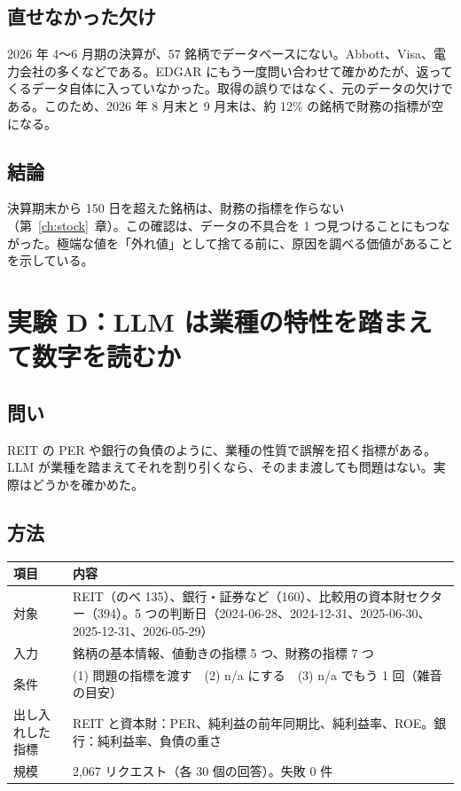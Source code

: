 \documentclass[xelatex,ja=standard,jafont=hiragino-pron,a4paper,10pt]{bxjsreport}
\newcommand{\chapref}[1]{第~\ref{#1}~章}
\begin{document}
\section{直せなかった欠け}

2026 年 4〜6 月期の決算が、57 銘柄でデータベースにない。Abbott、Visa、電力会社の多くなどである。EDGAR にもう一度問い合わせて確かめたが、返ってくるデータ自体に入っていなかった。取得の誤りではなく、元のデータの欠けである。このため、2026 年 8 月末と 9 月末は、約 12\% の銘柄で財務の指標が空になる。

\section{結論}

決算期末から 150 日を超えた銘柄は、財務の指標を作らない（\chapref{ch:stock}）。この確認は、データの不具合を 1 つ見つけることにもつながった。極端な値を「外れ値」として捨てる前に、原因を調べる価値があることを示している。

\chapter{実験 D：LLM は業種の特性を踏まえて数字を読むか}\label{ch:expD}

\section{問い}

REIT の PER や銀行の負債のように、業種の性質で誤解を招く指標がある。LLM が業種を踏まえてそれを割り引くなら、そのまま渡しても問題はない。実際はどうかを確かめた。

\section{方法}

\begin{longtable}{p{3.20cm}p{11.20cm}}
\toprule
\textbf{項目} & \textbf{内容} \\
\midrule
\endfirsthead
\bottomrule
\endfoot
対象 & REIT（のべ 135）、銀行・証券など（160）、比較用の資本財セクター（394）。5 つの判断日（2024-06-28、2024-12-31、2025-06-30、2025-12-31、2026-05-29） \\
入力 & 銘柄の基本情報、値動きの指標 5 つ、財務の指標 7 つ \\
条件 & (1) 問題の指標を渡す　(2) n/a にする　(3) n/a でもう 1 回（雑音の目安） \\
出し入れした指標 & REIT と資本財：PER、純利益の前年同期比、純利益率、ROE。銀行：純利益率、負債の重さ \\
規模 & 2,067 リクエスト（各 30 個の回答）。失敗 0 件 \\
\end{longtable}
\end{document}
